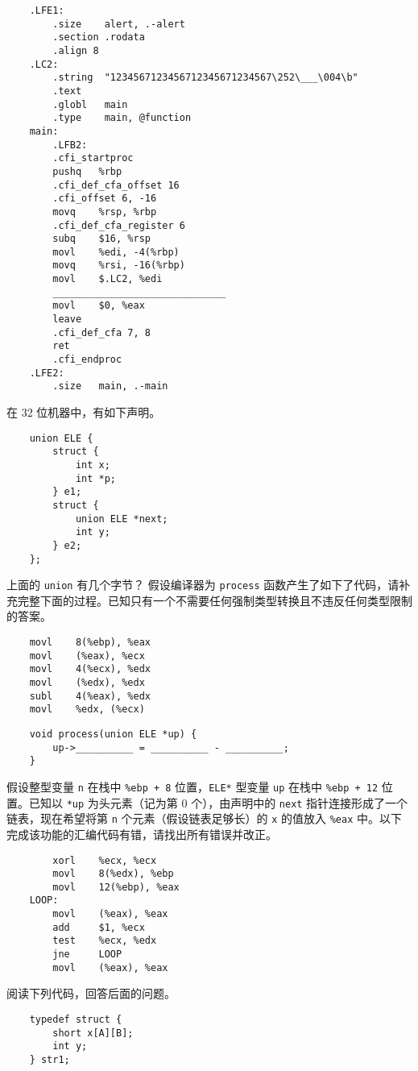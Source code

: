 \begin{problems}
\begin{verbatim}
    .LFE1:
        .size    alert, .-alert
        .section .rodata
        .align 8
    .LC2:
        .string  "1234567123456712345671234567\252\___\004\b"
        .text
        .globl   main
        .type    main, @function
    main:
        .LFB2:
        .cfi_startproc
        pushq   %rbp
        .cfi_def_cfa_offset 16
        .cfi_offset 6, -16
        movq    %rsp, %rbp
        .cfi_def_cfa_register 6
        subq    $16, %rsp
        movl    %edi, -4(%rbp)
        movq    %rsi, -16(%rbp)
        movl    $.LC2, %edi
        ______________________________
        movl    $0, %eax
        leave
        .cfi_def_cfa 7, 8
        ret
        .cfi_endproc
    .LFE2:
        .size   main, .-main
        \end{verbatim}
         在 32 位机器中，有如下声明。
        \begin{verbatim}
    union ELE {
        struct {
            int x;
            int *p;
        } e1;
        struct {
            union ELE *next;
            int y;
        } e2;
    };
        \end{verbatim}
        \qn 上面的 \verb|union| 有几个字节？
        \qn 假设编译器为 \verb|process| 函数产生了如下了代码，请补充完整下面的过程。已知只有一个不需要任何强制类型转换且不违反任何类型限制的答案。
        \begin{verbatim}
    movl    8(%ebp), %eax
    movl    (%eax), %ecx
    movl    4(%ecx), %edx
    movl    (%edx), %edx
    subl    4(%eax), %edx
    movl    %edx, (%ecx)
        \end{verbatim}
        \begin{verbatim}
    void process(union ELE *up) {
        up->__________ = __________ - __________;
    }
        \end{verbatim}
        \qn 假设整型变量 \verb|n| 在栈中 \verb|%ebp + 8| 位置，\verb|ELE*| 型变量 \verb|up| 在栈中 \verb|%ebp + 12| 位置。已知以 \verb|*up| 为头元素（记为第 0 个），由声明中的 \verb|next| 指针连接形成了一个链表，现在希望将第 \verb|n| 个元素（假设链表足够长）的 \verb|x| 的值放入 \verb|%eax| 中。以下完成该功能的汇编代码有错，请找出所有错误并改正。
        \begin{verbatim}
        xorl    %ecx, %ecx
        movl    8(%edx), %ebp
        movl    12(%ebp), %eax
    LOOP:
        movl    (%eax), %eax
        add     $1, %ecx
        test    %ecx, %edx
        jne     LOOP
        movl    (%eax), %eax
        \end{verbatim}
        \qn 阅读下列代码，回答后面的问题。
        \begin{verbatim}
    typedef struct {
        short x[A][B];
        int y;
    } str1;


\end{verbatim}
\end{problems}
